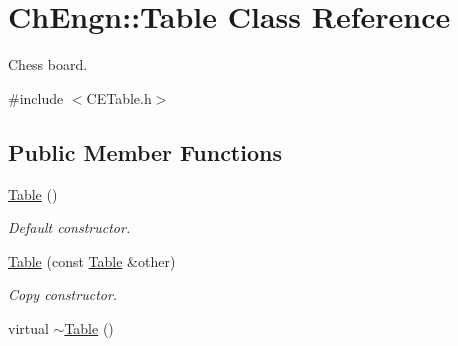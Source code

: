 \hypertarget{classChEngn_1_1Table}{
\section{ChEngn::Table Class Reference}
\label{classChEngn_1_1Table}
}


Chess board.  




{\ttfamily \#include $<$CETable.h$>$}

\subsection*{Public Member Functions}
\begin{DoxyCompactItemize}
\item 
\hypertarget{classChEngn_1_1Table_acca1b7e7ea3e28fc5aa33e3efd71dcd1}{
\hyperlink{classChEngn_1_1Table_acca1b7e7ea3e28fc5aa33e3efd71dcd1}{Table} ()}
\label{classChEngn_1_1Table_acca1b7e7ea3e28fc5aa33e3efd71dcd1}

\begin{DoxyCompactList}\small\item\em Default constructor. \item\end{DoxyCompactList}\item 
\hyperlink{classChEngn_1_1Table_a9ccad112470efda3d3b6cfe55341bf01}{Table} (const \hyperlink{classChEngn_1_1Table}{Table} \&other)
\begin{DoxyCompactList}\small\item\em Copy constructor. \item\end{DoxyCompactList}\item 
\hypertarget{classChEngn_1_1Table_a2fd42d65e704c471d11808d269bb97a7}{
virtual \hyperlink{classChEngn_1_1Table_a2fd42d65e704c471d11808d269bb97a7}{$\sim$Table} ()}
\label{classChEngn_1_1Table_a2fd42d65e704c471d11808d269bb97a7}


\end{DoxyCompactItemize}

